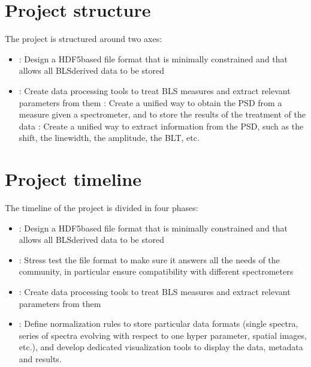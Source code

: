 \documentclass[letterpaper,10pt,english]{sphinxmanual}
\begin{document}
\section{Project structure}
\label{\detokenize{source/project:project-structure}}
\sphinxAtStartPar
The project is structured around two axes:
\begin{itemize}
\item {} 
\sphinxAtStartPar
{}: Design a HDF5\sphinxhyphen{}based file format that is minimally constrained and that allows all BLS\sphinxhyphen{}derived data to be stored

\item {} 
\sphinxAtStartPar
{}: Create data processing tools to treat BLS measures and extract relevant parameters from them
\sphinxhyphen{} : Create a unified way to obtain the PSD from a measure given a spectrometer, and to store the results of the treatment of the data
\sphinxhyphen{} : Create a unified way to extract information from the PSD, such as the shift, the linewidth, the amplitude, the BLT, etc.

\end{itemize}


\section{Project timeline}
\label{\detokenize{source/project:project-timeline}}
\sphinxAtStartPar
The timeline of the project is divided in four phases:
\begin{itemize}
\item {} 
\sphinxAtStartPar
{}: Design a HDF5\sphinxhyphen{}based file format that is minimally constrained and that allows all BLS\sphinxhyphen{}derived data to be stored

\item {} 
\sphinxAtStartPar
{}: Stress test the file format to make sure it answers all the needs of the community, in particular ensure compatibility with different spectrometers

\item {} 
\sphinxAtStartPar
{}: Create data processing tools to treat BLS measures and extract relevant parameters from them

\item {} 
\sphinxAtStartPar
{}: Define normalization rules to store particular data formats (single spectra, series of spectra evolving with respect to one hyper parameter, spatial images, etc.), and develop dedicated visualization tools to display the data, metadata and results.

\end{itemize}
\end{document}
